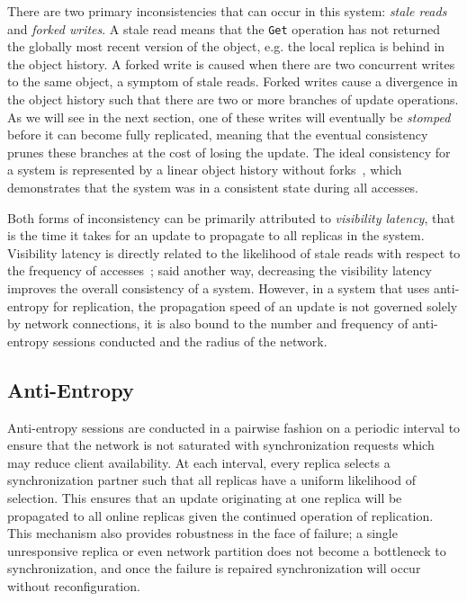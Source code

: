 There are two primary inconsistencies that can occur in this system:
\textit{stale reads} and \textit{forked writes}.
A stale read means that the \texttt{Get} operation has not returned
the globally most recent version of the object, e.g. the local replica is
behind in the object history.
A forked write is caused when there are two concurrent writes to the same
object, a symptom of stale reads.
Forked writes cause a divergence in the object history such that there are
two or more branches of update operations.
As we will see in the next section, one of these writes will eventually be
\textit{stomped} before it can become fully replicated, meaning that the
eventual consistency prunes these branches at the cost of losing
the update.
The ideal consistency for a system is represented by a linear object history
without forks~\cite{rethinking_eventual}, which demonstrates that the
system was in a consistent state during all accesses.

Both forms of inconsistency can be primarily attributed to \emph{visibility
latency}, that is the time it takes for an update to propagate to all
replicas in the system.
Visibility latency is directly related to the likelihood of stale reads with
respect to the frequency of accesses~\cite{quantifying_pbs}; said
another way, decreasing the visibility latency improves the overall
consistency of a system.
However, in a system that uses anti-entropy for replication, the propagation
speed of an update is not governed solely by network connections, it is also
bound to the number and frequency of anti-entropy sessions conducted and the
radius of the network.

\subsection{Anti-Entropy}

Anti-entropy sessions are conducted in a pairwise fashion on a periodic
interval to ensure that the network is not saturated with synchronization
requests which may reduce client availability.
At each interval, every replica selects a synchronization partner such that
all replicas have a uniform likelihood of selection.
This ensures that an update originating at one replica will be propagated to
all online replicas given the continued operation of replication.
This mechanism also provides robustness in the face of failure; a single
unresponsive replica or even network partition does not become a bottleneck
to synchronization, and once the failure is repaired synchronization will
occur without reconfiguration.

